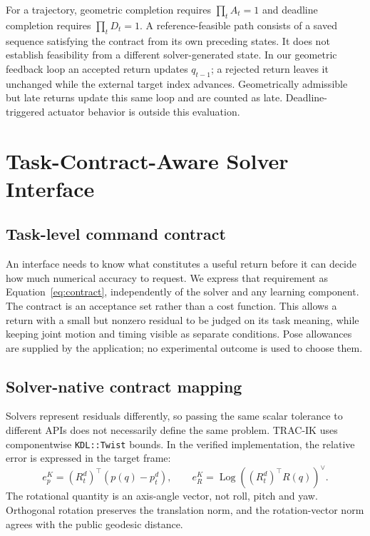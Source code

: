 \documentclass[10pt,a4paper]{article}
\begin{document}
For a trajectory, geometric completion requires $\prod_t A_t=1$ and deadline
completion requires $\prod_t D_t=1$. A reference-feasible path consists of a
saved sequence satisfying the contract from its own preceding states.
It does not establish feasibility from a different solver-generated state.
In our geometric feedback loop an accepted return updates $q_{t-1}$; a rejected
return leaves it unchanged while the external target index advances.
Geometrically admissible but late returns update this same loop and are counted
as late. Deadline-triggered actuator behavior is outside this evaluation.

\section{Task-Contract-Aware Solver Interface}
\label{sec:interface}

\subsection{Task-level command contract}

An interface needs to know what constitutes a useful return before it can
decide how much numerical accuracy to request. We express that requirement
as Equation~\eqref{eq:contract}, independently of the solver and any learning
component. The contract is an acceptance set rather than a cost function.
This allows a return with a small but nonzero residual to be judged on its
task meaning, while keeping joint motion and timing visible as separate
conditions. Pose allowances are supplied by the application; no experimental
outcome is used to choose them.

\subsection{Solver-native contract mapping}
\label{sec:mapping}

Solvers represent residuals differently, so passing the same scalar tolerance
to different APIs does not necessarily define the same problem.
TRAC-IK uses componentwise \texttt{KDL::Twist} bounds.
In the verified implementation, the relative error is expressed in the target
frame:
\begin{equation}
 e_p^K=(R_t^d)^\top(p(q)-p_t^d),\qquad
 e_R^K=\operatorname{Log}((R_t^d)^\top R(q))^\vee .
\end{equation}
The rotational quantity is an axis-angle vector, not roll, pitch and yaw.
Orthogonal rotation preserves the translation norm, and the rotation-vector
norm agrees with the public geodesic distance.
\end{document}
